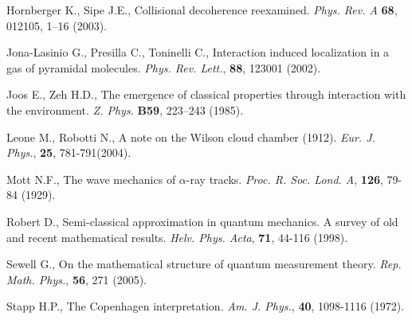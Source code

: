 \documentclass[12pt,reqno]{amsart}
\newcommand{\vs}{\medskip}
\numberwithin{equation}{section}
\begin{document}
\begin{thebibliography}{99}
 Hornberger K., Sipe J.E., Collisional decoherence reexamined. 
{\em Phys. Rev. A} {\bf 68}, 012105, 1--16 (2003).

 Jona-Lasinio G., Presilla C., Toninelli C., Interaction induced localization in a gas of pyramidal molecules. {\em Phys. Rev. Lett.}, {\bf 88}, 123001 (2002).

 Joos E., Zeh H.D., The emergence of classical properties through
interaction with the environment. {\em Z. Phys.} {\bf B59}, 223--243
(1985).


 Leone M., Robotti N., A note on the Wilson cloud chamber (1912). {\em Eur. J. Phys.}, {\bf 25}, 781-791(2004). 

 Mott  N.F., The wave mechanics of $\alpha$-ray tracks. {\em Proc. R. Soc.
Lond. A}, {\bf  126}, 79-84 (1929).

 Robert D.,  Semi-classical approximation in quantum mechanics. A survey of old and recent mathematical results. {\em Helv. Phys. Acta}, {\bf 71}, 44-116 (1998).


 Sewell G., On the mathematical structure of quantum measurement theory. {\em Rep. Math. Phys.}, {\bf 56}, 271 (2005).

 Stapp H.P., The Copenhagen interpretation. {\em Am. J. Phys.}, {\bf 40}, 1098-1116 (1972).

\end{thebibliography}



\vs
\vs
\vs









\end{document}
